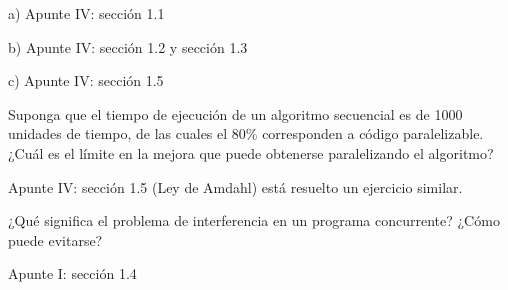 \documentclass[a4paper, 10pt]{article}
\newenvironment{main_question}
	{\noindent\begin{enumerate}[resume=series-name]\bfseries}
	{\end{enumerate}}
\newenvironment{answer}
	{\noindent\par\normalfont}
	{}
\begin{document}
\begin{answer}
a) Apunte IV: sección 1.1

b) Apunte IV: sección 1.2 y sección 1.3

c) Apunte IV: sección 1.5
\end{answer}
\begin{main_question}
\item Suponga que el tiempo de ejecución de un algoritmo secuencial es de 1000 unidades de tiempo, de las cuales 
el 80\% corresponden a código paralelizable. ¿Cuál es el límite en la mejora que puede obtenerse  paralelizando el 
algoritmo?
\end{main_question}
\begin{answer}
Apunte IV: sección 1.5 (Ley de Amdahl) está resuelto un ejercicio similar.
\end{answer}
\begin{main_question}
\item ¿Qué significa el problema de interferencia en un programa concurrente? ¿Cómo puede evitarse? 
\end{main_question}
\begin{answer}
Apunte I: sección 1.4
\end{answer}
\end{document}

